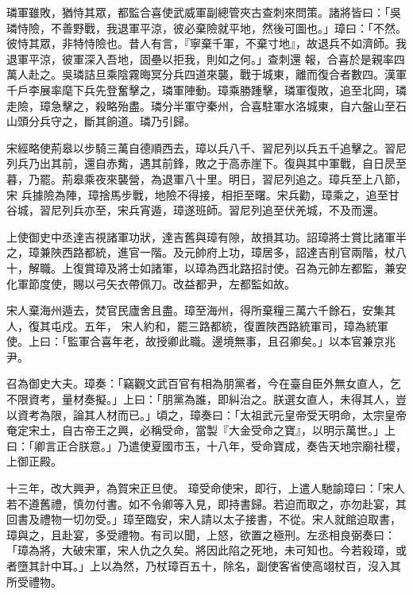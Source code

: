 \begin{pinyinscope}
 璘軍雖敗，猶恃其眾，都監合喜使武威軍副總管夾古查刺來問策。諸將皆曰：「吳璘恃險，不善野戰，我退軍平涼，彼必棄險就平地，然後可圖也。」璋曰：「不然。彼恃其眾，非特恃險也。昔人有言，『寧棄千軍，不棄寸地』，故退兵不如濟師。我退軍平涼，彼軍深入吾地，固壘以拒我，則如之何。」查刺還
 報，合喜於是親率四萬人赴之。吳璘詰旦乘陰霧晦冥分兵四道來襲，戰于城東，離而復合者數四。漢軍千戶李展率麾下兵先登奮擊之，璘軍陣動。璋乘勝踵擊，璘軍復敗，追至北岡，璘走險，璋急擊之，殺略殆盡。璘分半軍守秦州，合喜駐軍水洛城東，自六盤山至石山頭分兵守之，斷其餉道。璘乃引歸。



 宋經略使荊皋以步騎三萬自德順西去，璋以兵八千、習尼列以兵五千追擊之。習尼列兵乃出其前，還自赤觜，遇其前鋒，敗之于高赤崖下。復與其中軍戰，自日昃至暮，乃罷。荊皋乘夜來襲營，為退軍八十里。明日，習尼列追之。璋兵至上八節，宋
 兵據險為陣，璋捨馬步戰，地險不得接，相拒至曙。宋兵勸，璋乘之，追至甘谷城，習尼列兵亦至，宋兵宵遁，璋遂班師。習尼列追至伏羌城，不及而還。



 上使御史中丞達吉視諸軍功狀，達吉舊與璋有隙，故損其功。詔璋將士賞比諸軍半之，璋兼陜西路都統，進官一階。及元帥府上功，璋居多，詔達吉削官兩階，杖八十，解職。上復賞璋及將士如諸軍，以璋為西北路招討使。召為元帥左都監，兼安化軍節度使，賜以弓矢衣帶佩刀。改益都尹，左都監如故。



 宋人棄海州遁去，焚官民廬舍且盡。璋至海州，得所棄糧三萬六千餘石，安集其人，復其屯戍。五年，
 宋人約和，罷三路都統，復置陜西路統軍司，璋為統軍使。上曰：「監軍合喜年老，故授卿此職。邊境無事，且召卿矣。」以本官兼京兆尹。



 召為御史大夫。璋奏：「竊觀文武百官有相為朋黨者，今在臺自臣外無女直人，乞不限資考，量材奏擬。」上曰：「朋黨為誰，即糾治之。朕選女直人，未得其人，豈以資考為限，論其人材而已。」頃之，璋奏曰：「太祖武元皇帝受天明命，太宗皇帝奄定宋土，自古帝王之興，必稱受命，當製『大金受命之寶』，以明示萬世。」上曰：「卿言正合朕意。」乃遣使夏國市玉，十八年，受命寶成，奏告天地宗廟社稷，上御正殿。



 十三年，改大興尹，為賀宋正旦使。
 璋受命使宋，即行，上遣人馳諭璋曰：「宋人若不遵舊禮，慎勿付書。如不令卿等入見，即持書歸。若迫而取之，亦勿赴宴，其回書及禮物一切勿受。」璋至臨安，宋人請以太子接書，不從。宋人就館迫取書，璋與之，且赴宴，多受禮物。有司以聞，上怒，欲置之極刑。左丞相良弼奏曰：「璋為將，大破宋軍，宋人仇之久矣。將因此陷之死地，未可知也。今若殺璋，或者墮其計中耳。」上以為然，乃杖璋百五十，除名，副使客省使高翊杖百，沒入其所受禮物。




\end{pinyinscope}
